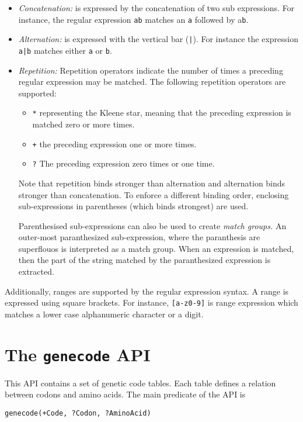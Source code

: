 \documentclass{book}
\begin{document}
\begin{itemize}
\item \emph{Concatenation:} is expressed by the concatenation of two
  sub expressions. For instance, the regular expression  \texttt{ab}
  matches an \texttt{a} followed by a\texttt{b}.
\item \emph{Alternation:} is expressed with the vertical bar (\texttt{|}). For
  instance the expression \texttt{a|b} matches either \texttt{a} or \texttt{b}.
\item \emph{Repetition:} Repetition operators indicate the number of
  times a preceding regular expression may be matched. The following 
repetition operators are supported:
\begin{itemize}
\item \texttt{*} representing the Kleene star, meaning that the
  preceding expression is matched zero or more times.
\item \texttt{+} the preceding expression one or more times.
\item \texttt{?} The preceding expression zero times or one time.
\end{itemize}

Note that repetition binds stronger than alternation and alternation
binds stronger than concatenation. To enforce a different binding
order, enclosing sub-expressions in parentheses (which binds strongest)
are used.

Parenthesised sub-expressions can also be used to create \emph{match
  groups.} 
An outer-most paranthesized sub-expression,
  where the paranthesis are superflouos is interpreted as a match
  group. When an expression is matched, then the part of the string matched by the
  paranthesized expression is extracted. 
\end{itemize}

Additionally, ranges are supported by the regular expression syntax.
A range is expressed using square brackets. For instance,
\texttt{[a-z0-9]} is range expression which matches a lower case
alphanumeric character or a digit. 

\section{The \texttt{genecode} API}
\label{sec:genecode}

This API contains a set of genetic code tables. Each table defines
a relation between codons and amino acids. The main predicate of the API
is 
\begin{verbatim}
genecode(+Code, ?Codon, ?AminoAcid)
\end{verbatim}
\end{document}
